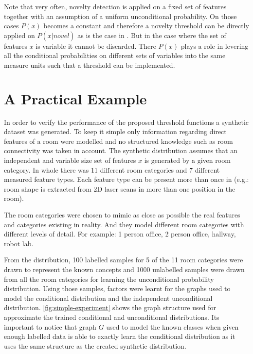 Note that very often, novelty detection is applied on a fixed set of features
together with an assumption of a uniform unconditional probability.
On those cases $P(x)$ becomes a constant and therefore a novelty threshold
can be directly applied on $P(x|\overline{novel})$ as is the case in \cite{bishop1994novelty}.
But in the case where the set of features $x$ is variable it cannot be
discarded. There $P(x)$ plays a role in levering all the conditional
probabilities on different sets of variables into the same measure units
such that a threshold can be implemented.



\section{A Practical Example}
\label{sec:unlabelled-data}
In order to verify the performance of the proposed threshold functions a synthetic dataset
was generated. To keep it simple only information regarding direct features of
a room were modelled and no structured knowledge such as room connectivity was taken
in account.
The synthetic distribution assumes that an independent and variable size set of features
$x$ is generated by a given room category.
In whole there was 11 different room categories and 7 different measured feature
types. Each feature type can be present more than once in (e.g.: room shape is
extracted from 2D laser scans in more than one position in the room).

The room categories were chosen to mimic as close as possible the real features and
categories existing in reality. And they model different room categories with
different levels of detail. For example: 1 person office, 2 person office, hallway,
robot lab.

From the distribution, 100 labelled samples for 5 of the 11 room categories were
drawn to represent the known concepts and 1000 unlabelled samples were drawn from
all the room categories for learning the unconditional probability distribution.
Using those samples, factors were learnt for the graphs used to model the
conditional distribution and the independent unconditional distribution.
\autoref{fig:simple-experiment} shows the graph structure used for approximate the
trained conditional and unconditional distributions.
Its important to notice that graph $G$ used to model the known classes when given
enough labelled data is able to exactly learn the conditional distribution as it
uses the same structure as the created synthetic distribution.

